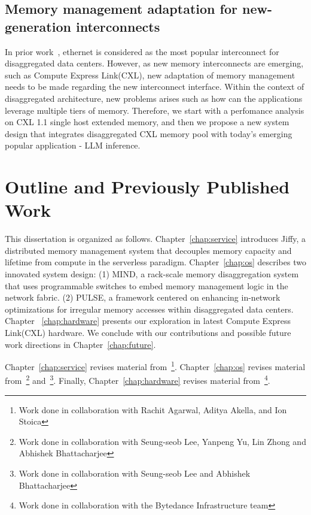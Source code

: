 \subsection{Memory management adaptation for new-generation interconnects}
In prior work~\cite{mind,legoos}, ethernet is considered as the most popular interconnect for disaggregated data centers. However, as new memory interconnects are emerging, such as Compute Express Link(CXL), new adaptation of memory management needs to be made regarding the new interconnect interface. Within the context of disaggregated architecture, new problems arises such as how can the applications leverage multiple tiers of memory. Therefore, we start with a perfomance analysis on CXL 1.1 single host extended memory, and then we propose a new system design that integrates disaggregated CXL memory pool with today's emerging popular application - LLM inference.

\section{Outline and Previously Published Work}

This dissertation is organized as follows. Chapter~\ref{chap:service} introduces Jiffy, a distributed memory management system that decouples memory capacity and lifetime from compute in the serverless paradigm. Chapter~\ref{chap:os} describes two innovated system design: (1) MIND, a rack-scale memory disaggregation system that uses programmable switches to embed memory management logic in
the network fabric. (2) PULSE, a framework centered on enhancing in-network optimizations for
irregular memory accesses within disaggregated data centers. Chapter ~\ref{chap:hardware} presents our exploration in latest Compute Express Link(CXL) hardware. We conclude with our contributions and possible future work directions in Chapter~\ref{chap:future}.

Chapter~\ref{chap:service} revises material from~\cite{jiffy}\footnote{Work done in collaboration with Rachit Agarwal, Aditya Akella, and Ion Stoica}. Chapter~\ref{chap:os} revises material from~\cite{mind}\footnote{Work done in collaboration with Seung-seob Lee, Yanpeng Yu, Lin Zhong and Abhishek Bhattacharjee} and~\cite{chase}\footnote{Work done in collaboration with Seung-seob Lee and Abhishek Bhattacharjee}. Finally, Chapter~\ref{chap:hardware} revises material from~\cite{cxleurosys}\footnote{Work done in collaboration with the Bytedance Infrastructure team}.
